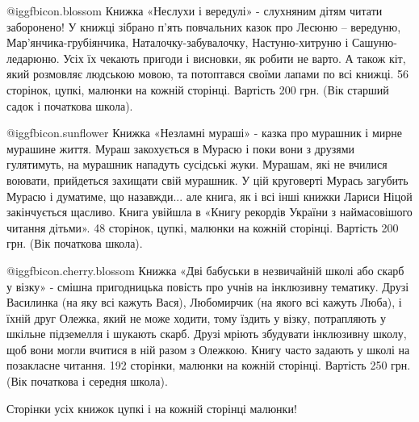 @igg{fbicon.blossom}  Книжка «Неслухи і вередулі» - слухняним дітям читати
заборонено! У книжці зібрано п’ять повчальних казок про Лесюню – вередуню,
Мар’янчика-грубіянчика, Наталочку-забувалочку, Настуню-хитруню і
Сашуню-ледарюню. Усіх їх чекають пригоди і висновки, як робити не варто. А
також кіт, який розмовляє людською мовою, та потоптався своїми лапами по всі
книжці. 56 сторінок, цупкі, малюнки на кожній сторінці. Вартість 200 грн. (Вік
старший садок і початкова школа).

@igg{fbicon.sunflower} Книжка «Незламні мураші» - казка про мурашник і мирне
мурашине життя. Мураш закохується в Мурасю і поки вони з друзями гулятимуть,
на мурашник нападуть сусідські жуки. Мурашам, які не вчилися воювати,
прийдеться захищати свій мурашник. У цій круговерті Мурась загубить Мурасю і
думатиме, що назавжди... але книга, як і всі інші книжки Лариси Ніцой
закінчується щасливо. Книга увійшла в «Книгу рекордів України з наймасовішого
читання дітьми». 48 сторінок, цупкі, малюнки на кожній сторінці. Вартість 200
грн. (Вік початкова школа).

@igg{fbicon.cherry.blossom}  Книжка «Дві бабуськи в незвичайній школі або
скарб у візку» - смішна пригодницька повість про учнів на інклюзивну тематику.
Друзі Василинка (на яку всі кажуть Вася), Любомирчик (на якого всі кажуть
Люба), і їхній друг Олежка, який не може ходити, тому їздить у візку,
потрапляють у шкільне підземелля і шукають скарб. Друзі мріють збудувати
інклюзивну школу, щоб вони могли вчитися в ній разом з Олежкою. Книгу часто
задають у школі на позакласне читання. 192 сторінки, малюнки на кожній
сторінці. Вартість 250 грн. (Вік початкова і середня школа).

Сторінки усіх книжок цупкі і на кожній сторінці малюнки!
